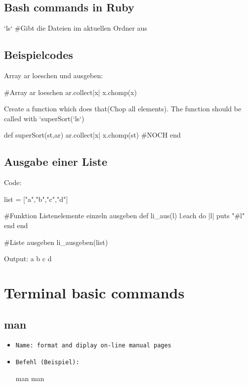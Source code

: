 \documentclass[10pt,a4paper]{scrartcl}
\begin{document}
\subsection{Bash commands in Ruby}
\begin{terminalcode}
`ls`				#Gibt die Dateien im aktuellen Ordner aus


\end{terminalcode}
\subsection{Beispielcodes}
Array ar loeschen und ausgeben:
\begin{terminalcode}
#Array ar loeschen
ar.collect{|x| x.chomp(x)}
\end{terminalcode}

Create a function which does that(Chop all elements). The function should be called with `superSort(`ls`)

\begin{terminalcode}
def superSort(st,ar)
	ar.collect{|x| x.chomp(st)} #NOCH
end
\end{terminalcode}


\subsection{Ausgabe einer Liste}

\begin{terminalcode}
Code:

list = ["a","b","c","d"]

#Funktion Listenelemente einzeln ausgeben
def li_aus(l)
        l.each do |l|
                puts "#{l}"
        end
end

#Liste ausgeben
li_ausgeben(list)

Output:
a
b
c
d

\end{terminalcode}
\newpage

\section{Terminal basic commands}
\subsection{man}
\begin{itemize}
\item \texttt{Name:  		 format and diplay on-line manual pages} 
\item \texttt{Befehl (Beispiel):}
\begin{terminalcode}
man man 
\end{terminalcode}

\end{itemize}
\end{document}
